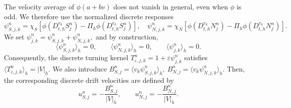 \documentclass[11pt,twoside]{article}
\numberwithin{equation}{section}
\theoremstyle{plain}
\theoremstyle{nonumberplain}
\begin{document}
{{The velocity average of \(\phi(a+bv)\) does not vanish in general, even
when \(\phi\) is odd. We therefore use the normalized discrete responses
\[
\psi_{S,j,k}^n
=
\chi_S
\left[
\phi\left(D_{t,h}^{v_k}S_j^n\right)
-
\Pi_h
\phi\left(D_{t,h}^{v_k}S_j^n\right)
\right],\quad
\psi_{N,j,k}^n
=
\chi_N
\left[
\phi\left(D_{t,h}^{v_k}N_j^n\right)
-
\Pi_h
\phi\left(D_{t,h}^{v_k}N_j^n\right)
\right].
\]
We set
$\psi_{j,k}^n
=
\psi_{S,j,k}^n+\psi_{N,j,k}^n ,$
and by construction,
\[
\langle \psi_{S,j,k}^n\rangle_h=0,
\qquad
\langle \psi_{N,j,k}^n\rangle_h=0,
\qquad
\langle \psi_{j,k}^n\rangle_h=0.
\]
Consequently, the discrete turning kernel $
T_{\varepsilon,j,k}^n
=
1+\varepsilon \psi_{j,k}^n$
satisfies
$
\langle T_{\varepsilon,j,k}^n\rangle_h=|V|_h.$
We also introduce
$
B_{S,j}^n
=
\langle v_k\psi_{S,j,k}^n\rangle_h,
\
B_{N,j}^n
=
\langle v_k\psi_{N,j,k}^n\rangle_h.
$
Then, the corresponding discrete drift velocities are defined by
\[
u_{S,j}^n
=
-\frac{B_{S,j}^n}{|V|_h},
\qquad
u_{N,j}^n
=
-\frac{B_{N,j}^n}{|V|_h}.
\]

}}
\end{document}
